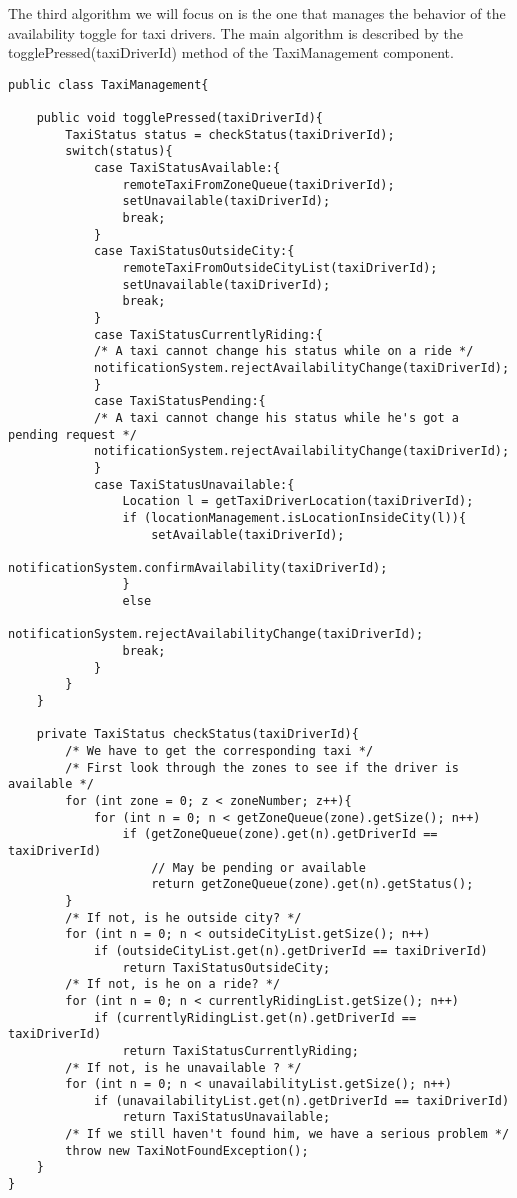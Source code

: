 The third algorithm we will focus on is the one that manages the behavior of the availability toggle for taxi drivers. The main algorithm is described by the togglePressed(taxiDriverId) method of the TaxiManagement component.
\begin{lstlisting}
public class TaxiManagement{

	public void togglePressed(taxiDriverId){
		TaxiStatus status = checkStatus(taxiDriverId);
		switch(status){
			case TaxiStatusAvailable:{
				remoteTaxiFromZoneQueue(taxiDriverId);
				setUnavailable(taxiDriverId);
				break;
			}
			case TaxiStatusOutsideCity:{
				remoteTaxiFromOutsideCityList(taxiDriverId);
				setUnavailable(taxiDriverId);
				break;
			}
			case TaxiStatusCurrentlyRiding:{
			/* A taxi cannot change his status while on a ride */
			notificationSystem.rejectAvailabilityChange(taxiDriverId);
			}
			case TaxiStatusPending:{
			/* A taxi cannot change his status while he's got a pending request */
			notificationSystem.rejectAvailabilityChange(taxiDriverId);
			}
			case TaxiStatusUnavailable:{
				Location l = getTaxiDriverLocation(taxiDriverId);
				if (locationManagement.isLocationInsideCity(l)){
					setAvailable(taxiDriverId);
					notificationSystem.confirmAvailability(taxiDriverId);
				}
				else 
					notificationSystem.rejectAvailabilityChange(taxiDriverId);
				break;
			}
		}
	}

	private TaxiStatus checkStatus(taxiDriverId){
		/* We have to get the corresponding taxi */
		/* First look through the zones to see if the driver is available */
		for (int zone = 0; z < zoneNumber; z++){
			for (int n = 0; n < getZoneQueue(zone).getSize(); n++)
				if (getZoneQueue(zone).get(n).getDriverId == taxiDriverId)
					// May be pending or available
					return getZoneQueue(zone).get(n).getStatus();
		}
		/* If not, is he outside city? */
		for (int n = 0; n < outsideCityList.getSize(); n++)
			if (outsideCityList.get(n).getDriverId == taxiDriverId)
				return TaxiStatusOutsideCity;
		/* If not, is he on a ride? */
		for (int n = 0; n < currentlyRidingList.getSize(); n++)
			if (currentlyRidingList.get(n).getDriverId == taxiDriverId)
				return TaxiStatusCurrentlyRiding;
		/* If not, is he unavailable ? */
		for (int n = 0; n < unavailabilityList.getSize(); n++)
			if (unavailabilityList.get(n).getDriverId == taxiDriverId)
				return TaxiStatusUnavailable;
		/* If we still haven't found him, we have a serious problem */
		throw new TaxiNotFoundException();		
	}
}
\end{lstlisting}


